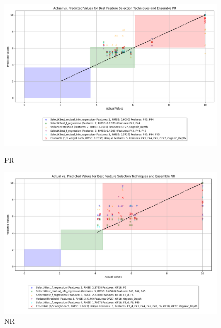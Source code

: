 \begin{figure}[H]
    \centering
    \begin{minipage}{0.45\textwidth}
        \centering
        \includegraphics[width=\linewidth]{reg_section_specxtra/images_reg_featred_ensemble/actual_vs_predicted_smallest_feature_selection_and_ensemble_PR.png}
        \caption{PR}
        \label{fig_reg_specxtra:pr_reg_featred_smallest_ensemble}
    \end{minipage}\hfill
    \begin{minipage}{0.45\textwidth}
        \centering
        \includegraphics[width=\linewidth]{reg_section_specxtra/images_reg_featred_ensemble/actual_vs_predicted_smallest_feature_selection_and_ensemble_NR.png}
        \caption{NR}
        \label{fig_reg_specxtra:nr_reg_featred_smallest_ensemble}
    \end{minipage}
\end{figure}

